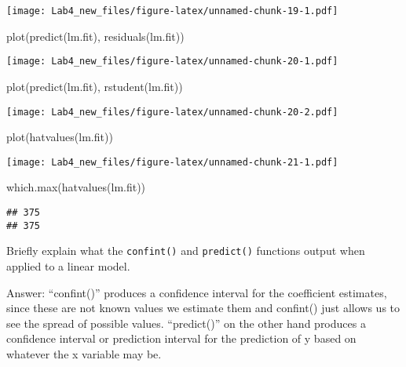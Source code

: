 \documentclass[
]{article}
\newenvironment{Shaded}{\begin{snugshade}}{\end{snugshade}}
\newcommand{\FunctionTok}[1]{\textcolor[rgb]{0.00,0.00,0.00}{#1}}
\newcommand{\NormalTok}[1]{#1}
\begin{document}
\texttt{[image: Lab4\_new\_files/figure-latex/unnamed-chunk-19-1.pdf]}

\begin{Shaded}
\begin{Highlighting}[]
\FunctionTok{plot}\NormalTok{(}\FunctionTok{predict}\NormalTok{(lm.fit), }\FunctionTok{residuals}\NormalTok{(lm.fit))}
\end{Highlighting}
\end{Shaded}

\texttt{[image: Lab4\_new\_files/figure-latex/unnamed-chunk-20-1.pdf]}

\begin{Shaded}
\begin{Highlighting}[]
\FunctionTok{plot}\NormalTok{(}\FunctionTok{predict}\NormalTok{(lm.fit), }\FunctionTok{rstudent}\NormalTok{(lm.fit))}
\end{Highlighting}
\end{Shaded}

\texttt{[image: Lab4\_new\_files/figure-latex/unnamed-chunk-20-2.pdf]}

\begin{Shaded}
\begin{Highlighting}[]
\FunctionTok{plot}\NormalTok{(}\FunctionTok{hatvalues}\NormalTok{(lm.fit))}
\end{Highlighting}
\end{Shaded}

\texttt{[image: Lab4\_new\_files/figure-latex/unnamed-chunk-21-1.pdf]}

\begin{Shaded}
\begin{Highlighting}[]
\FunctionTok{which.max}\NormalTok{(}\FunctionTok{hatvalues}\NormalTok{(lm.fit))}
\end{Highlighting}
\end{Shaded}

\begin{verbatim}
## 375 
## 375
\end{verbatim}

Briefly explain what the \texttt{confint()} and \texttt{predict()}
functions output when applied to a linear model.

Answer: ``confint()'' produces a confidence interval for the coefficient
estimates, since these are not known values we estimate them and
confint() just allows us to see the spread of possible values.
``predict()'' on the other hand produces a confidence interval or
prediction interval for the prediction of y based on whatever the x
variable may be.
\end{document}

